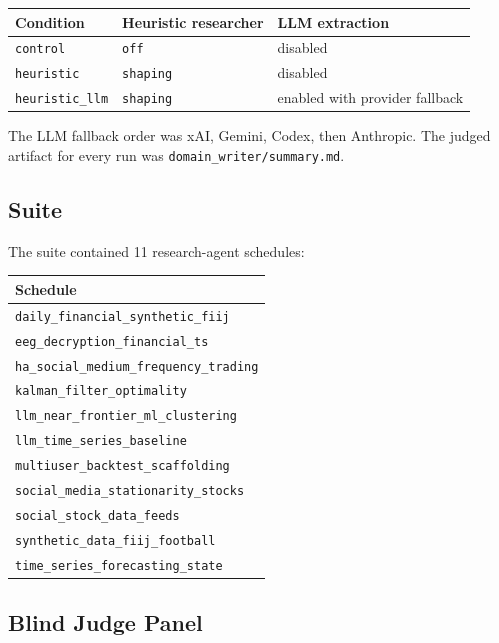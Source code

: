 \documentclass[11pt]{article}
\begin{document}
\begin{center}
\begin{tabular}{lll}
\toprule
Condition & Heuristic researcher & LLM extraction \\
\midrule
\texttt{control} & \texttt{off} & disabled \\
\texttt{heuristic} & \texttt{shaping} & disabled \\
\texttt{heuristic\_llm} & \texttt{shaping} & enabled with provider fallback \\
\bottomrule
\end{tabular}
\end{center}

The LLM fallback order was xAI, Gemini, Codex, then Anthropic. The judged
artifact for every run was \texttt{domain\_writer/summary.md}.

\subsection{Suite}

The suite contained 11 research-agent schedules:

\begin{center}
\begin{tabular}{l}
\toprule
Schedule \\
\midrule
\texttt{daily\_financial\_synthetic\_fiij} \\
\texttt{eeg\_decryption\_financial\_ts} \\
\texttt{ha\_social\_medium\_frequency\_trading} \\
\texttt{kalman\_filter\_optimality} \\
\texttt{llm\_near\_frontier\_ml\_clustering} \\
\texttt{llm\_time\_series\_baseline} \\
\texttt{multiuser\_backtest\_scaffolding} \\
\texttt{social\_media\_stationarity\_stocks} \\
\texttt{social\_stock\_data\_feeds} \\
\texttt{synthetic\_data\_fiij\_football} \\
\texttt{time\_series\_forecasting\_state} \\
\bottomrule
\end{tabular}
\end{center}

\subsection{Blind Judge Panel}
\end{document}
